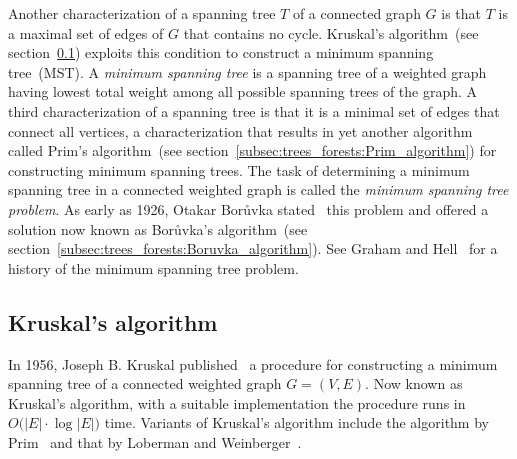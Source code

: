 Another characterization of a spanning tree $T$
of a connected graph $G$ is that $T$ is a maximal set of edges of $G$
that contains no cycle.
Kruskal's algorithm~(see
section~\ref{subsec:trees_forests:Kruskal_algorithm}) exploits this
condition to construct a minimum spanning
tree~(MST). A
\emph{minimum spanning tree} is a
spanning tree of a weighted
graph having lowest total weight among all possible
spanning trees of the graph. A third
characterization of a spanning tree is that it is
a minimal set of edges that connect all vertices, a characterization
that results in yet another algorithm called
Prim's algorithm~(see
section~\ref{subsec:trees_forests:Prim_algorithm}) for constructing
minimum spanning trees. The task of
determining a minimum spanning tree in a
connected weighted graph is called the
\emph{minimum spanning tree problem}.
As early as 1926, Otakar Bor\r{u}vka
stated~\cite{Boruvka1926a,Boruvka1926b} this problem and offered a
solution now known as Bor\r{u}vka's
algorithm~(see
section~\ref{subsec:trees_forests:Boruvka_algorithm}). See
Graham and
Hell~\cite{GrahamHell1985} for a history of the
minimum spanning tree problem.



\subsection{Kruskal's algorithm}
\label{subsec:trees_forests:Kruskal_algorithm}

In 1956, Joseph B. Kruskal
published~\cite{Kruskal1956} a procedure for constructing a
minimum spanning tree of a connected
weighted graph $G = (V,E)$. Now known as
Kruskal's algorithm, with a suitable
implementation the procedure runs in $O\big(|E| \cdot \log |E|\big)$
time. Variants of Kruskal's algorithm
include the algorithm by Prim~\cite{Prim1957} and
that by Loberman and
Weinberger~\cite{LobermanWeinberger1957}.

